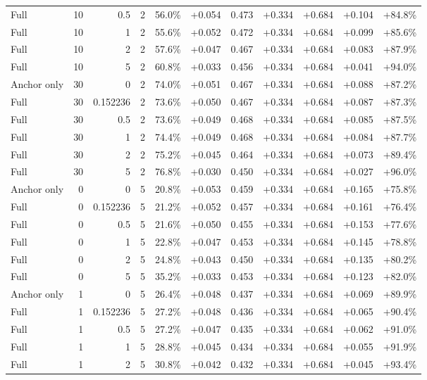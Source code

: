 \begin{table}[htbp]
\begin{tabular}{lrrrccccccc}
Full & 10 & 0.5 & 2 & 56.0\% & +0.054 & 0.473 & +0.334 & +0.684 & +0.104 & +84.8\% \\
Full & 10 & 1 & 2 & 55.6\% & +0.052 & 0.472 & +0.334 & +0.684 & +0.099 & +85.6\% \\
Full & 10 & 2 & 2 & 57.6\% & +0.047 & 0.467 & +0.334 & +0.684 & +0.083 & +87.9\% \\
Full & 10 & 5 & 2 & 60.8\% & +0.033 & 0.456 & +0.334 & +0.684 & +0.041 & +94.0\% \\
Anchor only & 30 & 0 & 2 & 74.0\% & +0.051 & 0.467 & +0.334 & +0.684 & +0.088 & +87.2\% \\
Full & 30 & 0.152236 & 2 & 73.6\% & +0.050 & 0.467 & +0.334 & +0.684 & +0.087 & +87.3\% \\
Full & 30 & 0.5 & 2 & 73.6\% & +0.049 & 0.468 & +0.334 & +0.684 & +0.085 & +87.5\% \\
Full & 30 & 1 & 2 & 74.4\% & +0.049 & 0.468 & +0.334 & +0.684 & +0.084 & +87.7\% \\
Full & 30 & 2 & 2 & 75.2\% & +0.045 & 0.464 & +0.334 & +0.684 & +0.073 & +89.4\% \\
Full & 30 & 5 & 2 & 76.8\% & +0.030 & 0.450 & +0.334 & +0.684 & +0.027 & +96.0\% \\
Anchor only & 0 & 0 & 5 & 20.8\% & +0.053 & 0.459 & +0.334 & +0.684 & +0.165 & +75.8\% \\
Full & 0 & 0.152236 & 5 & 21.2\% & +0.052 & 0.457 & +0.334 & +0.684 & +0.161 & +76.4\% \\
Full & 0 & 0.5 & 5 & 21.6\% & +0.050 & 0.455 & +0.334 & +0.684 & +0.153 & +77.6\% \\
Full & 0 & 1 & 5 & 22.8\% & +0.047 & 0.453 & +0.334 & +0.684 & +0.145 & +78.8\% \\
Full & 0 & 2 & 5 & 24.8\% & +0.043 & 0.450 & +0.334 & +0.684 & +0.135 & +80.2\% \\
Full & 0 & 5 & 5 & 35.2\% & +0.033 & 0.453 & +0.334 & +0.684 & +0.123 & +82.0\% \\
Anchor only & 1 & 0 & 5 & 26.4\% & +0.048 & 0.437 & +0.334 & +0.684 & +0.069 & +89.9\% \\
Full & 1 & 0.152236 & 5 & 27.2\% & +0.048 & 0.436 & +0.334 & +0.684 & +0.065 & +90.4\% \\
Full & 1 & 0.5 & 5 & 27.2\% & +0.047 & 0.435 & +0.334 & +0.684 & +0.062 & +91.0\% \\
Full & 1 & 1 & 5 & 28.8\% & +0.045 & 0.434 & +0.334 & +0.684 & +0.055 & +91.9\% \\
Full & 1 & 2 & 5 & 30.8\% & +0.042 & 0.432 & +0.334 & +0.684 & +0.045 & +93.4\% \\

\end{tabular}
\end{table}
